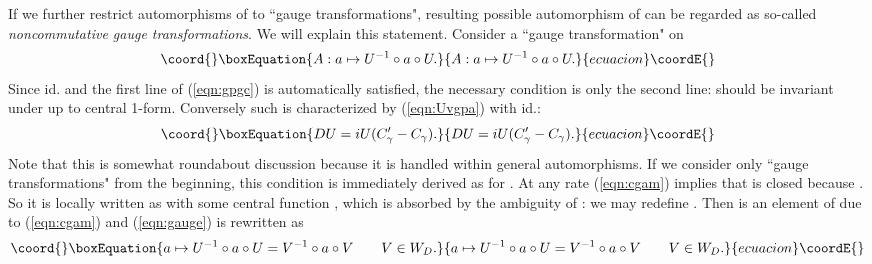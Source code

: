\documentclass[10pt,a4paper]{article}
\def\h{\hbar}
\begin{document}
If we further restrict automorphisms \coordHE{} of \coordHE{} to ``gauge transformations", resulting possible automorphism of \coordHE{} can be regarded as so-called {\it noncommutative gauge transformations}. We will explain this statement. Consider a ``gauge transformation" on \coordHE{}
\begin{equation}\coord{}\boxEquation{
\label{eqn:gauge}
A: a\mapsto U^{-1}\circ a \circ U.
}{
A: a\mapsto U^{-1}\circ a \circ U.
}{ecuacion}\coordE{}\end{equation}
Since \coordHE{}id. and the first line of (\ref{eqn:gpgc}) is automatically satisfied, the necessary condition is only the second line: \coordHE{} should be invariant under \coordHE{} up to central 1-form. Conversely such \coordHE{} is characterized by (\ref{eqn:Uvgpa}) with \coordHE{}id.:
\begin{equation}\coord{}\boxEquation{
\label{eqn:cgam}
DU=iU(C_\gamma'-C_\gamma).
}{
DU=iU(C_\gamma'-C_\gamma).
}{ecuacion}\coordE{}\end{equation}
Note that this is somewhat roundabout discussion because it is handled within general automorphisms. If we consider only ``gauge transformations" from the beginning, this condition is immediately derived as \myHighlight{$D'a=D(U^{-1}\circ a\circ U)={i\over\h}[U\circ DU^{-1},a]=0$}\coordHE{} for \coordHE{}.
At any rate (\ref{eqn:cgam}) implies that \coordHE{} is closed \coordHE{} because \coordHE{}. So it is locally written as \coordHE{} with some central function \coordHE{}, which is absorbed by the ambiguity of \coordHE{}: we may redefine \coordHE{}. Then \coordHE{} is an element of \coordHE{} due to (\ref{eqn:cgam}) and (\ref{eqn:gauge}) is rewritten as
\begin{equation}\coord{}\boxEquation{
\label{eqn:gtr}
a\mapsto U^{-1}\circ a\circ U=V^{-1}\circ a\circ V  \qquad V\in W_D.
}{
a\mapsto U^{-1}\circ a\circ U=V^{-1}\circ a\circ V  \qquad V\in W_D.
}{ecuacion}\coordE{}\end{equation}
\end{document}

